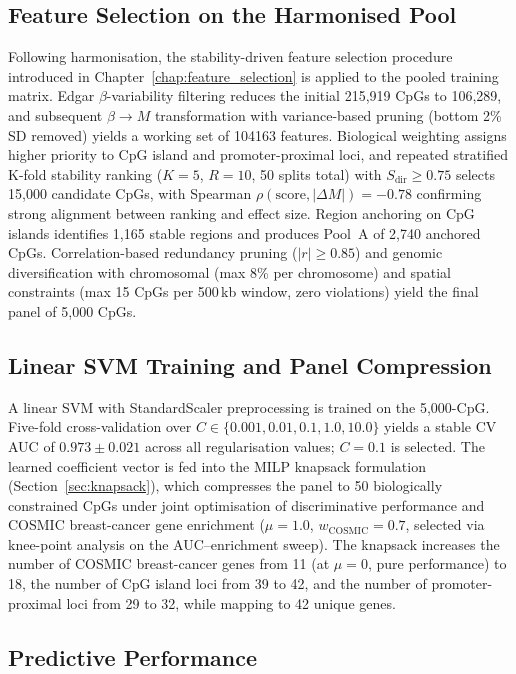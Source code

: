 \subsection{Feature Selection on the Harmonised Pool}

Following harmonisation, the stability-driven feature selection procedure
introduced in Chapter~\ref{chap:feature_selection} is applied to the pooled
training matrix.
Edgar $\beta$-variability filtering reduces the initial 215{,}919 CpGs to
106{,}289, and subsequent $\beta \rightarrow M$ transformation with
variance-based pruning (bottom 2\% SD removed) yields a working set of
\num{104163} features.
Biological weighting assigns higher priority to CpG island and promoter-proximal
loci, and repeated stratified K-fold stability ranking ($K=5$, $R=10$,
50 splits total) with $S_{\mathrm{dir}} \geq 0.75$ selects 15{,}000 candidate
CpGs, with Spearman $\rho(\mathrm{score},|\Delta M|) = -0.78$ confirming
strong alignment between ranking and effect size.
Region anchoring on CpG islands identifies 1{,}165 stable regions
and produces Pool~A of 2{,}740 anchored CpGs.
Correlation-based redundancy pruning ($|r| \geq 0.85$) and genomic
diversification with chromosomal (max 8\% per chromosome) and spatial
constraints (max 15 CpGs per 500\,kb window, zero violations) yield the final
panel of 5{,}000 CpGs.


\subsection{Linear SVM Training and Panel Compression}

A linear SVM with StandardScaler preprocessing is trained on the 5{,}000-CpG.
Five-fold cross-validation over $C \in \{0.001, 0.01, 0.1, 1.0, 10.0\}$ yields
a stable CV AUC of $0.973 \pm 0.021$ across all regularisation values;
$C = 0.1$ is selected.
The learned coefficient vector is fed into the MILP knapsack formulation
(Section~\ref{sec:knapsack}), which compresses the panel to 50 biologically
constrained CpGs under joint optimisation of discriminative performance and
COSMIC breast-cancer gene enrichment ($\mu = 1.0$, $w_{\mathrm{COSMIC}} = 0.7$,
selected via knee-point analysis on the AUC--enrichment sweep).
The knapsack increases the number of COSMIC breast-cancer genes from 11
(at $\mu=0$, pure performance) to 18, the number of CpG island loci
from 39 to 42, and the number of promoter-proximal loci from 29 to 32,
while mapping to 42 unique genes.

\subsection{Predictive Performance}

